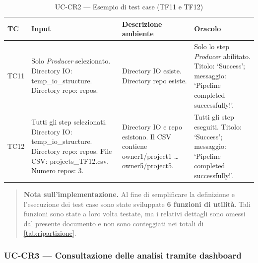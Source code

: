 \documentclass[11pt,a4paper]{article}
\makeatletter
\newif\ifmark@prevlower
\def\mark@casebreak#1{%
  \ifcat\noexpand#1\relax
    \mark@prevlowerfalse
  \else
    \ifnum`#1=\uccode`#1\relax
      \ifmark@prevlower\allowbreak\fi
      \mark@prevlowerfalse
    \else
      \ifnum`#1=\lccode`#1\relax
        \mark@prevlowertrue
      \else
        \mark@prevlowerfalse
      \fi
    \fi
  \fi}
\def\mark@brk#1{%
  \ifx#1\mark@stop
    \let\mark@next\relax
  \else
    \mark@casebreak{#1}%
    #1%
    \ifx#1.\allowbreak\else
      \ifx#1\_\allowbreak\else
        \ifx#1/\allowbreak\else
          \ifx#1(\allowbreak\fi
        \fi
      \fi
    \fi
    \let\mark@next\mark@brk
  \fi
  \mark@next}
\def\mark@stop{\mark@stop}
\DeclareRobustCommand{\mark@code}[1]{%
  \ifmmode
    \text{\ttfamily\small\mark@prevlowerfalse\mark@brk#1\mark@stop}%
  \else
    {\ttfamily\small\mark@prevlowerfalse\mark@brk#1\mark@stop}%
  \fi}
\DeclareRobustCommand{\code}[1]{\mark@code{#1}}
\DeclareRobustCommand{\file}[1]{\mark@code{#1}}
\def\mark@code#1{#1}%
\def\code#1{#1}%
\def\file#1{#1}%
\newcommand{\thead}[1]{\textbf{#1}}
\newenvironment{keypoints}
  {\begin{quote}\small}
  {\end{quote}}
\makeatother
\begin{document}
\begin{table}[H]
  \centering\small
  \caption{UC-CR2 --- Esempio di test case (TF11 e TF12)}
  \label{tab:st-cr2-tc}
  \begin{tabularx}{\linewidth}{@{}L{1.2cm} L{4.3cm} L{4.0cm} Y@{}}
    \toprule
    \thead{TC} & \thead{Input} & \thead{Descrizione ambiente} &
    \thead{Oracolo}\\
    \midrule
    TC11 & Solo \emph{Producer} selezionato.\newline
      Directory IO: \file{temp\_io\_structure}.\newline
      Directory repo: \file{repos}. &
      Directory IO esiste. Directory repo esiste. &
      Solo lo step \emph{Producer} abilitato.\newline
      Titolo: `Success'; messaggio: `Pipeline completed successfully!'.\\
    TC12 & Tutti gli step selezionati.\newline
      Directory IO: \file{temp\_io\_structure}.\newline
      Directory repo: \file{repos}.\newline
      File CSV: \file{projects\_TF12.csv}. Numero repos: 3. &
      Directory IO e repo esistono. Il CSV contiene
      \code{owner1/project1} \ldots \code{owner5/project5}. &
      Tutti gli step eseguiti.\newline
      Titolo: `Success'; messaggio: `Pipeline completed successfully!'.\\
    \bottomrule
  \end{tabularx}
\end{table}

\begin{keypoints}
\textbf{Nota sull'implementazione.} Al fine di semplificare la definizione e
l'esecuzione dei test case sono state sviluppate \textbf{6 funzioni di
utilit\`a}. Tali funzioni sono state a loro volta testate, ma i relativi
dettagli sono omessi dal presente documento e non sono conteggiati nei totali di
\cref{tab:ripartizione}.
\end{keypoints}

\subsubsection{UC-CR3 --- Consultazione delle analisi tramite dashboard}
\label{sec:st-cr3}
\end{document}
